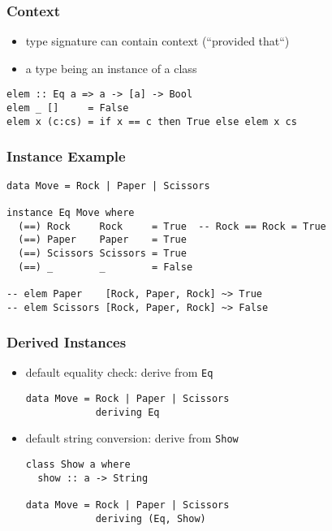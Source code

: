 \documentclass[dvipsnames]{beamer}
\theoremstyle{plain}
\begin{document}
\begin{frame}[fragile]
  \frametitle{Context}

  \begin{itemize}
    \item type signature can contain context (``provided that``)
    \item a type being an instance of a class
  \end{itemize}

  \begin{exampleblock}{}
    \begin{lstlisting}[deletekeywords={elem}]
elem :: Eq a => a -> [a] -> Bool
elem _ []     = False
elem x (c:cs) = if x == c then True else elem x cs
    \end{lstlisting}
  \end{exampleblock}
\end{frame}

\begin{frame}[fragile]
  \frametitle{Instance Example}

  \begin{lstlisting}
data Move = Rock | Paper | Scissors

instance Eq Move where
  (==) Rock     Rock     = True  -- Rock == Rock = True
  (==) Paper    Paper    = True
  (==) Scissors Scissors = True
  (==) _        _        = False

-- elem Paper    [Rock, Paper, Rock] ~> True
-- elem Scissors [Rock, Paper, Rock] ~> False
  \end{lstlisting}
\end{frame}

\begin{frame}[fragile]
  \frametitle{Derived Instances}

  \begin{itemize}
    \item default equality check: derive from \lstinline|Eq|

    \begin{lstlisting}
data Move = Rock | Paper | Scissors
            deriving Eq
    \end{lstlisting}
  \end{itemize}

  \pause
  \begin{itemize}
    \item default string conversion: derive from \lstinline|Show|
    \begin{lstlisting}
class Show a where
  show :: a -> String

data Move = Rock | Paper | Scissors
            deriving (Eq, Show)
   \end{lstlisting}
  \end{itemize}
\end{frame}
\end{document}
